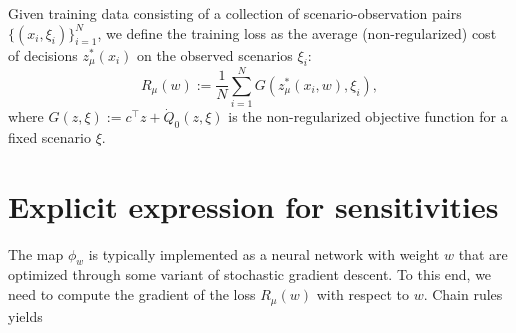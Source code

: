 \documentclass{article}
\begin{document}
Given training data consisting of a collection of scenario-observation pairs
$\{(x_i,\xi_i)\}_{i=1}^N$, we define the training loss as the average (non-regularized) cost of
decisions $ z^*_{\mu}(x_i)$ on the observed scenarios $\xi_i$:
\begin{equation}
    R_\mu(w) := \frac{1}{N}\sum_{i=1}^N G(z^*_{\mu}(x_i,w), \xi_i), 
\end{equation}
where
$G(z,\xi):= c^\top z + \dot Q_0(z,\xi)$ is the non-regularized objective function for a fixed scenario $\xi$.

\section{Explicit expression for sensitivities}
\label{sec:explicit}
The map $\phi_w$ is typically implemented as a neural network with weight $w$
that are optimized through some variant of stochastic gradient descent.
To this end, we need to compute the gradient of the loss $R_\mu(w)$ with
respect to $w$. Chain rules yields
\end{document}
